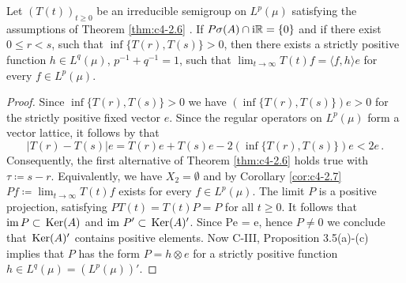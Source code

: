 \begin{corollary}\label{cor:c4-2.10}
Let $(T(t))_{t\geq 0}$ be an irreducible semigroup on $L^{p}(\mu)$ satisfying the assumptions of Theorem \ref{thm:c4-2.6} .
If $P{\sigma}(A) \cap \mathrm{i}\mathbb{R} = \{0\}$ and if there exist $0 \leq r < s$, such that $\inf\{T(r),T(s)\} > 0$, then there exists a strictly positive function $h \in L^{q}(\mu)$, $p^{-1}+q^{-1} = 1$, such that $\lim_{t \to \infty} T(t)f = \langle f,h \rangle e$ for every $f \in L^{p}(\mu)$.
\end{corollary}

\begin{proof}
Since $\inf\{T(r),T(s)\} > 0$ we have $(\inf\{T(r),T(s)\})e > 0$ for the strictly positive fixed vector $e$.
Since the regular operators on $L^{p}(\mu)$ form a vector lattice, it follows by \citet[II.1.4, Formula (5) \& (5')]{schaefer:1974} that 
\[
|T(r) - T(s)|e = T(r)e + T(s)e - 2(\inf\{T(r),T(s)\})e < 2e\, .
\]
Consequently, the first alternative of Theorem \ref{thm:c4-2.6} holds true with $\tau \coloneqq s-r$.
Equivalently, we have $X_{2} = \emptyset$ and by Corollary \ref{cor:c4-2.7} $Pf \coloneqq \lim_{t \to \infty} T(t)f$ exists for every $f \in L^{p}(\mu)$.
The limit $P$ is a positive projection, satisfying $PT(t) = T(t)P = P$ for all $t \geq 0$.
It follows that $\text{im}\,P \subset \mathop{}\mathrm{Ker}(A)$ and $\text{im } P' \subset \mathop{}\mathrm{Ker}(A)'$.
Since Pe = e, hence $P \neq 0$  we conclude that $\mathop{}\mathrm{Ker}(A)'$ contains positive elements.
Now C-III, Proposition 3.5(a)-(c) implies that $P$ has the form $P = h \otimes e$ for a strictly positive function $h \in L^{q}(\mu) = (L^{p}(\mu))'$.
\end{proof}

